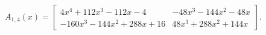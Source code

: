 \[
 A_{1,4}(x)=\left[\begin{matrix}4 x^{4} + 112 x^{3} - 112 x - 4 & - 48 x^{3} - 144 x^{2} - 48 x\\- 160 x^{3} - 144 x^{2} + 288 x + 16 & 48 x^{3} + 288 x^{2} + 144 x\end{matrix}\right] .
\]
